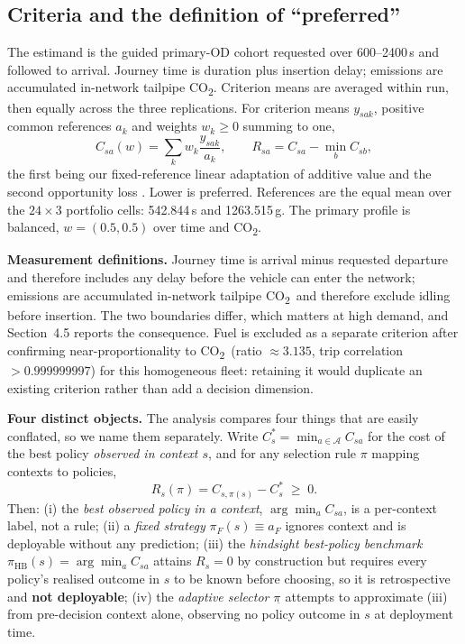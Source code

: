 \documentclass[10pt,a4paper]{article}
\newcommand{\CO}{CO\textsubscript{2}}
\begin{document}
\subsection{Criteria and the definition of ``preferred''}
The estimand is the guided primary-OD cohort requested over 600--2400\,s and followed to arrival. Journey time is duration plus insertion delay; emissions are accumulated in-network tailpipe \CO. Criterion means are averaged within run, then equally across the three replications. For criterion means $y_{sak}$, positive common references $a_k$ and weights $w_k\ge0$ summing to one,
\begin{equation}
C_{sa}(w)=\sum_k w_k\frac{y_{sak}}{a_k},\qquad
R_{sa}=C_{sa}-\min_b C_{sb},
\label{eq:cost}
\end{equation}
the first being our fixed-reference linear adaptation of additive value \cite{R15} and the second opportunity loss \cite{R24}. Lower is preferred. References are the equal mean over the $24\times3$ portfolio cells: 542.844\,s and 1263.515\,g. The primary profile is balanced, $w=(0.5,0.5)$ over time and \CO.

\textbf{Measurement definitions.} Journey time is arrival minus requested departure and therefore includes any delay before the vehicle can enter the network; emissions are accumulated in-network tailpipe \CO\ and therefore exclude idling before insertion. The two boundaries differ, which matters at high demand, and Section~4.5 reports the consequence. Fuel is excluded as a separate criterion after confirming near-proportionality to \CO\ (ratio $\approx3.135$, trip correlation $>0.999999997$) for this homogeneous fleet: retaining it would duplicate an existing criterion rather than add a decision dimension.

\textbf{Four distinct objects.} The analysis compares four things that are easily conflated, so we name them separately. Write $C^*_s=\min_{a\in\mathcal A}C_{sa}$ for the cost of the best policy \emph{observed in context $s$}, and for any selection rule $\pi$ mapping contexts to policies,
\begin{equation}
R_s(\pi)=C_{s,\pi(s)}-C^*_s \;\ge\; 0 .
\label{eq:regret}
\end{equation}
Then: (i) the \emph{best observed policy in a context}, $\arg\min_a C_{sa}$, is a per-context label, not a rule; (ii) a \emph{fixed strategy} $\pi_F(s)\equiv a_F$ ignores context and is deployable without any prediction; (iii) the \emph{hindsight best-policy benchmark} $\pi_{\mathrm{HB}}(s)=\arg\min_a C_{sa}$ attains $R_s=0$ by construction but requires every policy's realised outcome in $s$ to be known before choosing, so it is retrospective and \textbf{not deployable}; (iv) the \emph{adaptive selector} $\pi_{\widehat{}}$ attempts to approximate (iii) from pre-decision context alone, observing no policy outcome in $s$ at deployment time.
\end{document}
